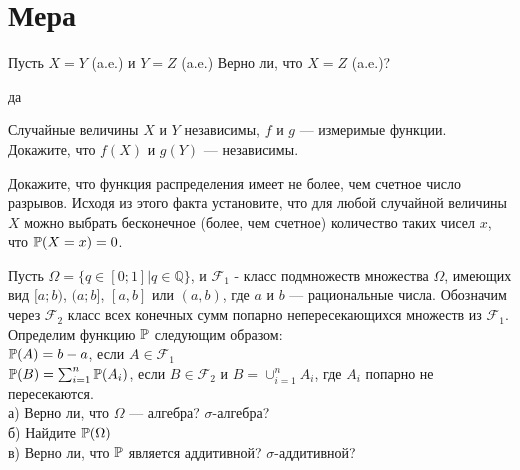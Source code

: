 \section{Мера} 

\begin{problem}
Пусть $X=Y$ (a.e.) и $Y=Z$ (a.e.) Верно ли, что $X=Z$ (a.e.)? 
\end{problem} 
\begin{solution} 
да
\end{solution}

\begin{problem}
Случайные величины $X$ и $Y$ независимы, $f$ и $g$ --- измеримые
функции. Докажите, что $f(X)$ и $g(Y)$ --- независимы. 
\end{problem} 
\begin{solution} 

\end{solution}

\begin{problem}
Докажите, что функция распределения имеет не более, чем счетное
число разрывов. Исходя из этого факта установите, что для любой
случайной величины $X$ можно выбрать бесконечное (более, чем
счетное) количество таких чисел $x$, что $\P(X=x)=0$. 
\end{problem} 
\begin{solution} 

\end{solution}

\begin{problem}
Пусть $\Omega=\{q\in[0;1]|q\in\mathbb{Q}\}$, и $\mathcal{F}_{1}$ -
класс подмножеств множества $\Omega$, имеющих вид $[a;b)$,
$(a;b]$, $[a,b]$ или $(a,b)$, где $a$ и $b$ --- рациональные числа.
Обозначим через $\mathcal{F}_{2}$ класс всех конечных сумм попарно
непересекающихся множеств из $\mathcal{F}_{1}$. Определим
функцию $\P$ следующим образом: \\
$\P(A)=b-a$, если $A\in \mathcal{F}_{1}$ \\
$\P(B)=\sum_{i=1}^{n}\P(A_{i})$, если $B\in
\mathcal{F}_{2}$ и $B=\cup_{i=1}^{n}A_{i}$, где $A_{i}$ попарно не
пересекаются. \\
а) Верно ли, что $\Omega$ --- алгебра? $\sigma$-алгебра? \\
б) Найдите $\P(\Omega)$ \\
в) Верно ли, что $\P$ является аддитивной?
$\sigma$-аддитивной? 
\end{problem} 
\begin{solution} 

\end{solution}

